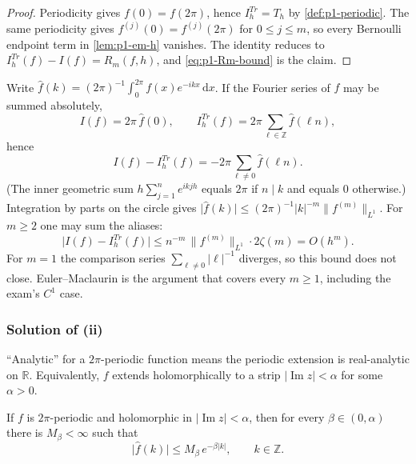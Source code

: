 \begin{proof}
Periodicity gives \(f(0)=f(2\pi)\), hence \(I_{h}^{Tr}=T_{h}\) by \cref{def:p1-periodic}. The same periodicity gives \(f^{(j)}(0)=f^{(j)}(2\pi)\) for \(0\le j\le m\), so every Bernoulli endpoint term in \cref{lem:p1-em-h} vanishes. The identity reduces to \(I_{h}^{Tr}(f)-I(f)=R_{m}(f,h)\), and \eqref{eq:p1-Rm-bound} is the claim.
\end{proof}

\begin{remark}[Fourier aliasing, and why it is not the proof of (i) for \(m=1\)]
\label{rem:p1-alias-cm}
Write \(\hat f(k)=(2\pi)^{-1}\int_{0}^{2\pi}f(x)e^{-ikx}\,\mathrm{d}x\). If the Fourier series of \(f\) may be summed absolutely,
\begin{equation}
\label{eq:p1-alias}
I(f)
=
2\pi\,\hat f(0),
\qquad
I_{h}^{Tr}(f)
=
2\pi\sum_{\ell\in\mathbb{Z}}\hat f(\ell n),
\end{equation}
hence
\[
I(f)-I_{h}^{Tr}(f)
=
-2\pi\sum_{\ell\neq 0}\hat f(\ell n).
\]
(The inner geometric sum \(h\sum_{j=1}^{n}e^{ikjh}\) equals \(2\pi\) if \(n\mid k\) and equals \(0\) otherwise.) Integration by parts on the circle gives \(\lvert\hat f(k)\rvert\le (2\pi)^{-1}\lvert k\rvert^{-m}\lVert f^{(m)}\rVert_{L^{1}}\). For \(m\ge 2\) one may sum the aliases:
\[
\bigl\lvert I(f)-I_{h}^{Tr}(f)\bigr\rvert
\le
n^{-m}\,\lVert f^{(m)}\rVert_{L^{1}}\cdot 2\zeta(m)
=
O(h^{m}).
\]
For \(m=1\) the comparison series \(\sum_{\ell\neq 0}\lvert\ell\rvert^{-1}\) diverges, so this bound does not close. Euler--Maclaurin is the argument that covers every \(m\ge 1\), including the exam's \(C^{1}\) case.
\end{remark}

\subsubsection{Solution of (ii)}

``Analytic'' for a \(2\pi\)-periodic function means the periodic extension is real-analytic on \(\mathbb{R}\). Equivalently, \(f\) extends holomorphically to a strip \(\lvert\operatorname{Im}z\rvert<\alpha\) for some \(\alpha>0\).

\begin{lemma}
\label{lem:p1-fourier-exp}
If \(f\) is \(2\pi\)-periodic and holomorphic in \(\lvert\operatorname{Im}z\rvert<\alpha\), then for every \(\beta\in(0,\alpha)\) there is \(M_{\beta}<\infty\) such that
\[
\lvert\hat f(k)\rvert
\le
M_{\beta}\,e^{-\beta\lvert k\rvert},
\qquad
k\in\mathbb{Z}.
\]
\end{lemma}

